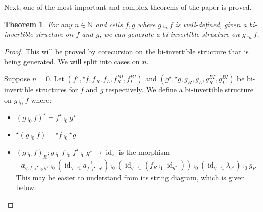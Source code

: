 \documentclass{article}
\newtheorem{theorem}{Theorem} \newtheorem{prop}[theorem]{Proposition}
\DeclareMathOperator{\id}{id}
\newcommand{\linv}[1]{{}^\star\!#1} \newcommand{\rinv}[1]{#1^\star}
\begin{document}
\noindent Next, one of the most important and complex theorems of the
paper is proved.

\begin{theorem}\label{bi-inv-composition}
  For any \(n \in \mathbb{N}\) and cells \(f,g\) where \(g \comp_n f\)
  is well-defined, given a bi-invertible structure on \(f\) and \(g\),
  we can generate a bi-invertible structure on \(g \comp_n f\).
\end{theorem}
\begin{proof}
  This will be proved by corecursion on the bi-invertible structure
  that is being generated. We will split into cases on \(n\).

  Suppose \(n = 0\). Let \((\rinv f, \linv f, f_R, f_L, f_R^{BI},
    f_L^{BI})\) and \((\rinv g, \linv g, g_R, g_L, g_R^{BI},
    g_L^{BI})\) be bi-invertible structures for \(f\) and \(g\)
    respectively. We define a bi-invertible structure on \(g
    \comp_0 f\) where:
    \begin{itemize}
    \item \(\rinv {(g \comp_0 f)} = \rinv f \comp_0 \rinv g\)
    \item \(\linv {(g \comp_0 f)} = \linv f \comp_0 \linv g\)
    \item \({(g \comp_0 f)}_R : g \comp_0 f \comp_0 \rinv f \comp_0
      \rinv g \to \id_z\) is the morphism
      \begin{equation*}
        a_{g, f, \rinv f \comp_0 \rinv g} \comp_0 (\id_g \comp_1 a_{f,\rinv f, \rinv g}^{-1}) \comp_0 (\id_g \comp_1 (f_R \comp_1 \id_{\rinv g})) \comp_0 (\id_g \comp_1 \lambda_{\rinv g}) \comp_0 g_R
      \end{equation*}
      This may be easier to understand from its string diagram, which
      is given below:
      \begin{center}

\end{center}
\end{itemize}
\end{proof}
\end{document}
